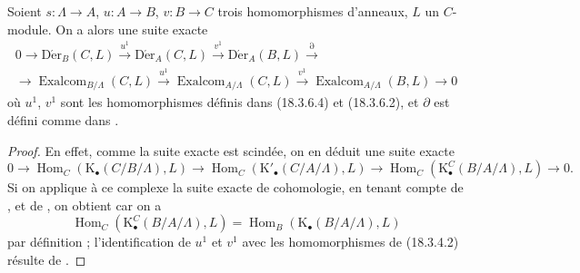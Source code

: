 \begin{proposition}[20.6.25]
\label{0.20.6.25-fr}
Soient $s:\Lambda\to A$, $u:A\to B$, $v:B\to C$ trois homomorphismes
d'anneaux, $L$ un $C$-module. On a alors une suite exacte
\begin{equation}
\tag{20.6.25.1}
\label{0.20.6.25.1-fr}
\begin{split}
  0\to\operatorname{D\acute{e}r}_B(C,L)\xrightarrow{u^1}
  \operatorname{D\acute{e}r}_A(C,L)\xrightarrow{v^1}
  \operatorname{D\acute{e}r}_A(B,L)\xrightarrow{\partial} \\
  \to\operatorname{Exalcom}_{B/\Lambda}(C,L)\xrightarrow{u^1}
  \operatorname{Exalcom}_{A/\Lambda}(C,L)\xrightarrow{v^1}
  \operatorname{Exalcom}_{A/\Lambda}(B,L)\to0
\end{split}
\end{equation}
où $u^1$, $v^1$ sont les homomorphismes définis dans (18.3.6.4) et
(18.3.6.2), et $\partial$ est défini comme dans .
\end{proposition}

\begin{proof}
En effet, comme la suite exacte  est scindée, on en
déduit une suite exacte
\[
  0\to\operatorname{Hom}_C(\mathrm{K}_\bullet(C/B/\Lambda),L)\to
  \operatorname{Hom}_C(\mathrm{K}'_\bullet(C/A/\Lambda),L)\to
  \operatorname{Hom}_C(\mathrm{K}^C_\bullet(B/A/\Lambda),L)\to0.
\]
Si on applique à ce complexe la suite exacte de cohomologie, en tenant compte
de , et de , on obtient
 car on a
\[
  \operatorname{Hom}_C(\mathrm{K}^C_\bullet(B/A/\Lambda),L)
  =\operatorname{Hom}_B(\mathrm{K}_\bullet(B/A/\Lambda),L)
\]
par définition ; l'identification de $u^1$ et $v^1$ avec les homomorphismes
de (18.3.4.2) résulte de .
\end{proof}

